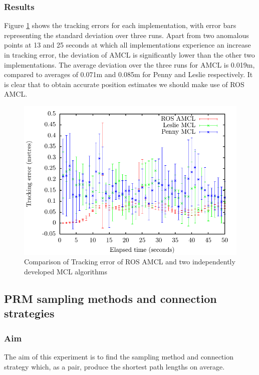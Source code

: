\documentclass[conference]{IEEEtran}
\begin{document}
\subsubsection{Results}
Figure \ref{fig:local} shows the tracking errors for each implementation, with error bars representing the standard deviation over three runs. Apart from two anomalous points at 13 and 25 seconds at which all implementations experience an increase in tracking error, the deviation of AMCL is significantly lower than the other two implementations. The average deviation over the three runs for AMCL is 0.019m, compared to averages of 0.071m and 0.085m for Penny and Leslie respectively. It is clear that to obtain accurate position estimates we should make use of ROS AMCL.
\begin{figure}
  \includegraphics[width=\columnwidth]{tracking_stdev}
  \caption{Comparison of Tracking error of ROS AMCL and two independently developed MCL algorithms}
  \label{fig:local}
\end{figure}
\subsection{PRM sampling methods and connection strategies}

\subsubsection{Aim}
The aim of this experiment is to find the sampling method and connection strategy which, as a pair, produce the shortest path lengths on average.
\end{document}
